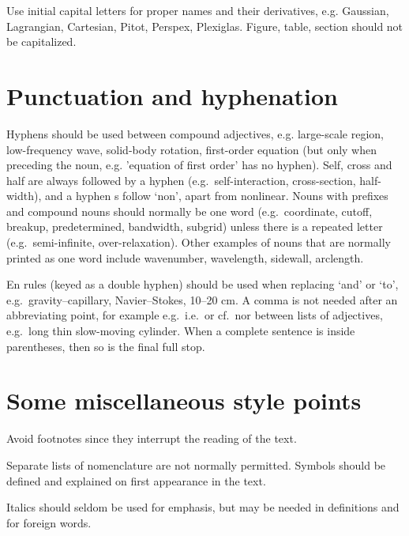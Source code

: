 Use initial capital letters for proper names and their derivatives, e.g.
Gaussian, Lagrangian, Cartesian, Pitot, Perspex, Plexiglas. Figure, table,
section should not be capitalized.

\section{Punctuation and hyphenation}

Hyphens should be used between compound adjectives, e.g. large-scale
region, low-frequency wave, solid-body rotation, first-order equation (but
only when preceding the noun, e.g. 'equation of first order' has no hyphen).
Self, cross and half are always followed by a hyphen (e.g.\ self-interaction,
cross-section, half-width), and a hyphen s follow `non', apart
from nonlinear. Nouns with prefixes and compound nouns should normally be one
word (e.g.\ coordinate, cutoff, breakup, predetermined, bandwidth, subgrid)
unless there is a repeated letter (e.g.\ semi-infinite, over-relaxation).
Other examples of nouns that are normally printed as one word include
wavenumber, wavelength, sidewall, arclength.

En rules (keyed as a double hyphen) should be used when replacing `and' or
`to', e.g.\ gravity--capillary, Navier--Stokes, 10--20 cm. A comma is not
needed after an abbreviating point, for example e.g.\ i.e.\ or cf.\ nor
between lists of adjectives, e.g.\ long thin slow-moving cylinder. When a
complete sentence is inside parentheses, then so is the final full stop.

\section{Some miscellaneous style points}

Avoid footnotes since they interrupt the reading of the text.

Separate lists of nomenclature are not normally permitted. Symbols should be
defined and explained on first appearance in the text.

Italics should seldom be used for emphasis, but may be needed in definitions
and for foreign words.



